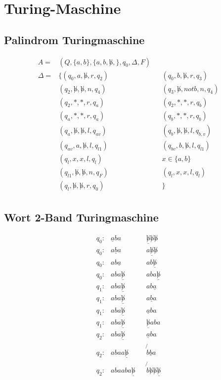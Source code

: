\section{Turing-Maschine}
\subsection{Palindrom Turingmaschine}
\begin{align*}
	A = &(Q,\{a,b\},\{a,b,\not b, \},q_0,\Delta,F) \\
	\Delta = &\{(q_0,a,\not b, r, q_2) &&(q_0, b, \not b, r, q_3)\\
	&(q_2, \not b, \not b, n, q_4) &&(q_3, \not b, not b, n, q_4)\\
	&(q_2, *, *, r, q_a) &&(q_2, *, *, r, q_b)\\
	&(q_a, *, *, r, q_a) &&(q_b, *, *, r, q_b)\\
	&(q_a, \not b, \not b, l, q_{av}) &&(q_b, \not b, \not b, l, q_{b,v})\\
	&(q_{av}, a, \not b, l, q_{l1}) &&(q_{bv}, b, \not b, l, q_{l1})\\
	&(q_l, x,x, l, q_l) &&x \in \{a,b\}\\
	&(q_{l1}, \not b, \not b, n, q_F) && (q_l, x,x,l,q_l)\\
	&(q_l, \not b, \not b, r, q_0) &&\}\\
\end{align*}
\subsection{Wort 2-Band Turingmaschine}
\begin{align*}
q_0: &\underline{a}ba &&\underline{\not b}\not b \not b\\
q_0: &a\underline{b}a &&a\underline{\not b}\not b\\
q_0: &ab\underline{a} &&ab\underline{\not b}\\
q_0: &aba\underline{\not b} &&aba\underline{\not b}\\
q_1: &aba\underline{\not b} && ab\underline{a}\\
q_1: &aba\underline{\not b} &&a\underline{b}a\\
q_1: &aba\underline{\not b} &&\underline{a}ba\\
q_1: &aba\underline{\not b} &&\underline{\not b}aba\\
q_2: &aba\underline{\not b} && \underline{a}ba\\
q_2: &abaa\underline{\not b} &&\not{b}\underline{b}a\\
q_2: &abaaba\underline{\not b} &&\not{b}\not b\not b\underline{\not b}
\end{align*}

